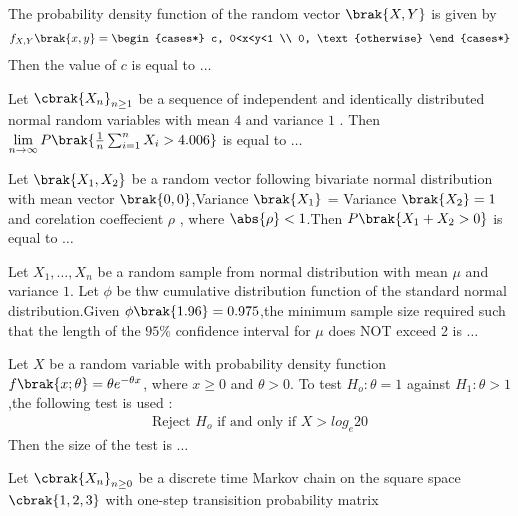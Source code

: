 \iffalse
\chapter{2019}
\author{EE24BTECH11011}
\section{st}
\fi
\item The probability density function of the random vector $\brak{X,Y}$ is given by
\begin{align}
	f_{X,Y}\brak{x,y} = \begin{cases*} c, 0<x<y<1 \\ 0, \text{otherwise} \end{cases*}
\end{align}
Then the value of $c$ is equal to $\dots$
\item Let $\cbrak{X_n}_{n \geq 1}$ be a sequence of independent and identically distributed normal random variables with mean $4$ and variance $1$ . Then $\lim\limits_{n \rightarrow \infty} P\brak{\frac{1}{n}\sum_{i=1}^n X_i > 4.006}$ is equal to $\dots$
\item Let $\brak{X_1,X_2}$ be a random vector following bivariate normal distribution with mean vector $\brak{0,0}$,Variance $\brak{X_1}$ = Variance $\brak{X_2} = 1$ and corelation coeffecient $\rho$ , where $\abs{\rho} <1$.Then $P\brak{X_1 + X_2 > 0}$ is equal to $\dots$
\item Let $X_1 , \dots , X_n$ be a random sample from normal distribution with mean $\mu$ and variance $1$. Let $\phi$ be thw cumulative distribution function of the standard normal distribution.Given  $\phi\brak{1.96} = 0.975$,the minimum sample size required such that the length of the $95\%$ confidence interval for $\mu$ does NOT exceed 2 is $\dots$
\item Let $X$ be a random variable with probability density function $f\brak{x;\theta} = \theta e^{-\theta x}$, where $x \geq 0$ and $\theta>0$. To test $H_o \colon \theta = 1$ against $H_1 \colon \theta > 1$,the following test is used :
	\begin{align}
		\text{Reject } H_o \text{ if and only if } X>log_e 20
\end{align}
Then the size of the test is $\dots$
\item Let $\cbrak{X_n}_{n\geq 0}$ be a discrete time Markov chain on the square space $\cbrak{1,2,3}$ with one-step transisition probability matrix
